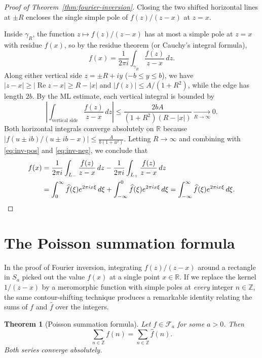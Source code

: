 \documentclass[11pt]{article}
\theoremstyle{plain}
\newtheorem{theorem}{Theorem}[section]
\theoremstyle{definition}
\theoremstyle{boldremark}
\theoremstyle{remark}
\numberwithin{equation}{section}
\newcommand{\R}{\mathbb{R}}
\newcommand{\Z}{\mathbb{Z}}
\DeclareMathOperator{\Real}{Re}
\newenvironment{lecturefigure}
 {\par\addvspace{0.25em}\begingroup\setlength{\parskip}{0pt}\centering}
 {\par\endgroup\addvspace{0.25em}}
\begin{document}
\begin{proof}[Proof of Theorem~\ref{thm:fourier-inversion}]
\begin{lecturefigure}
\begin{minipage}{\linewidth}
\vspace{0.15em}
{\small Closing the two shifted horizontal lines at $\pm R$ encloses the
single simple pole of $f(z)/(z-x)$ at $z=x$.}
\end{minipage}
\end{lecturefigure}

Inside $\gamma_R$, the function $z\mapsto f(z)/(z-x)$ has at most a simple
pole at $z=x$ with residue $f(x)$, so by the residue theorem (or Cauchy's
integral formula),
\[
 f(x) = \frac{1}{2\pi i}\int_{\gamma_R}\frac{f(z)}{z-x}\,dz.
\]
Along either vertical side $z=\pm R+iy$ ($-b\leq y\leq b$), we have
$|z-x|\geq|\Real z-x|\geq R-|x|$ and $|f(z)|\leq A/(1+R^2)$, while the
edge has length $2b$. By the ML estimate, each vertical integral is bounded
by
\[
 \left|\int_{\text{vertical side}}\frac{f(z)}{z-x}\,dz\right|
 \leq \frac{2bA}{(1+R^2)(R-|x|)} \xrightarrow[R\to\infty]{} 0.
\]
Both horizontal integrals converge absolutely on $\R$ because
$|f(u\pm ib)/(u\pm ib-x)|\leq \frac{A}{b(1+u^2)}$. Letting $R\to\infty$
and combining with \eqref{eq:inv-pos} and \eqref{eq:inv-neg}, we conclude
that
\begin{align*}
 f(x)
 &= \frac{1}{2\pi i}\int_{L_-}\frac{f(z)}{z-x}\,dz
  - \frac{1}{2\pi i}\int_{L_+}\frac{f(z)}{z-x}\,dz \\
 &= \int_0^\infty\widehat f(\xi)e^{2\pi ix\xi}\,d\xi
  + \int_{-\infty}^0\widehat f(\xi)e^{2\pi ix\xi}\,d\xi
  = \int_{-\infty}^{\infty}\widehat f(\xi)e^{2\pi ix\xi}\,d\xi. \qedhere
\end{align*}
\end{proof}


\section{The Poisson summation formula}

In the proof of Fourier inversion, integrating $f(z)/(z-x)$ around a
rectangle in $S_a$ picked out the value $f(x)$ at a single point $x\in\R$.
If we replace the kernel $1/(z-x)$ by a meromorphic function with simple
poles at \emph{every} integer $n\in\Z$, the same contour-shifting technique
produces a remarkable identity relating the sums of $f$ and $\widehat f$
over the integers.

\begin{theorem}[Poisson summation formula]\label{thm:poisson-summation}
Let $f\in\mathcal F_a$ for some $a>0$. Then
\begin{equation}\label{eq:poisson}
 \boxed{\displaystyle
  \sum_{n\in\Z} f(n) = \sum_{n\in\Z}\widehat f(n).}
\end{equation}
Both series converge absolutely.
\end{theorem}
\end{document}

